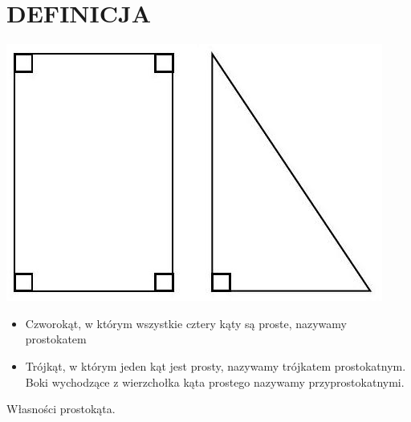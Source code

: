 \documentclass[10pt]{article}
\begin{document}
\section*{DEFINICJA}
\begin{center}
\includegraphics[max width=\textwidth]{2024_11_21_8f01584889ff06348ae7g-194}
\end{center}

\begin{itemize}
  \item Czworokąt, w którym wszystkie cztery kąty są proste, nazywamy prostokatem
  \item Trójkąt, w którym jeden kąt jest prosty, nazywamy trójkatem prostokatnym. Boki wychodzące z wierzchołka kąta prostego nazywamy przyprostokatnymi.
\end{itemize}

Własności prostokąta.
\end{document}

